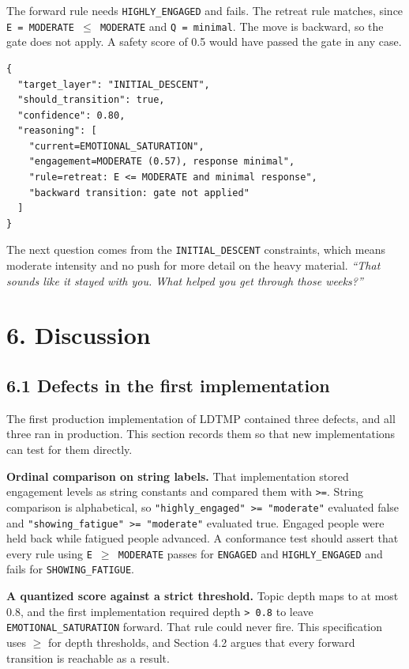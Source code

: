 \documentclass[11pt]{article}
\begin{document}
The forward rule needs \texttt{HIGHLY\_\allowbreak{}ENGAGED} and fails. The retreat
rule matches, since \texttt{E\ =\ MODERATE\ $\leq$\ MODERATE} and
\texttt{Q\ =\ minimal}. The move is backward, so the gate does not
apply. A safety score of 0.5 would have passed the gate in any case.

\begin{verbatim}
{
  "target_layer": "INITIAL_DESCENT",
  "should_transition": true,
  "confidence": 0.80,
  "reasoning": [
    "current=EMOTIONAL_SATURATION",
    "engagement=MODERATE (0.57), response minimal",
    "rule=retreat: E <= MODERATE and minimal response",
    "backward transition: gate not applied"
  ]
}
\end{verbatim}

The next question comes from the \texttt{INITIAL\_\allowbreak{}DESCENT} constraints,
which means moderate intensity and no push for more detail on the heavy
material. \emph{``That sounds like it stayed with you. What helped you
get through those weeks?''}

\section{6. Discussion}

\subsection{6.1 Defects in the first implementation}

The first production implementation of LDTMP contained three defects,
and all three ran in production. This section records them so that new
implementations can test for them directly.

\textbf{Ordinal comparison on string labels.} That implementation stored
engagement levels as string constants and compared them with
\texttt{\textgreater{}=}. String comparison is alphabetical, so
\texttt{"highly\_\allowbreak{}engaged"\ \textgreater{}=\ "moderate"} evaluated false
and \texttt{"showing\_\allowbreak{}fatigue"\ \textgreater{}=\ "moderate"} evaluated
true. Engaged people were held back while fatigued people advanced. A
conformance test should assert that every rule using
\texttt{E\ $\geq$\ MODERATE} passes for \texttt{ENGAGED} and
\texttt{HIGHLY\_\allowbreak{}ENGAGED} and fails for \texttt{SHOWING\_\allowbreak{}FATIGUE}.

\textbf{A quantized score against a strict threshold.} Topic depth maps
to at most 0.8, and the first implementation required depth
\texttt{\textgreater{}\ 0.8} to leave \texttt{EMOTIONAL\_\allowbreak{}SATURATION}
forward. That rule could never fire. This specification uses \texttt{$\geq$}
for depth thresholds, and Section 4.2 argues that every forward
transition is reachable as a result.
\end{document}

